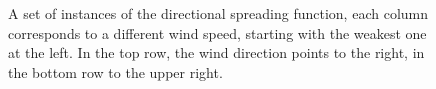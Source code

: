 \begin{figure}
{ }
\caption{A set of instances of the directional spreading function, each column 
corresponds to a different wind speed, starting with the weakest one at the 
left. In the top row, the wind direction points to the right, in the bottom row 
to the upper right.}
\label{fig:phillips_directional_term}
\end{figure}
